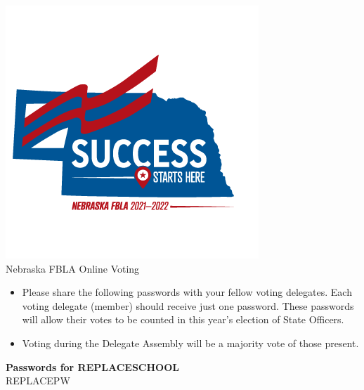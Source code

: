 \documentclass{article}
\begin{document}
\begin{center}

\includegraphics{pdfs/template/logo.png} \\

{\Huge Nebraska FBLA Online Voting}

\end{center}


{
    \begin{itemize}
    \large
    \item Please share the following passwords with your fellow voting
    delegates. Each voting delegate (member) should receive just one
    password. These passwords will allow their votes to be counted in
    this year’s election of State Officers.

    \item Voting during the Delegate Assembly will be a majority vote of
    those present.

    \end{itemize}
}

\large
\centering
\textbf{Passwords for REPLACESCHOOL} \\
REPLACEPW
\centering
\end{document}
